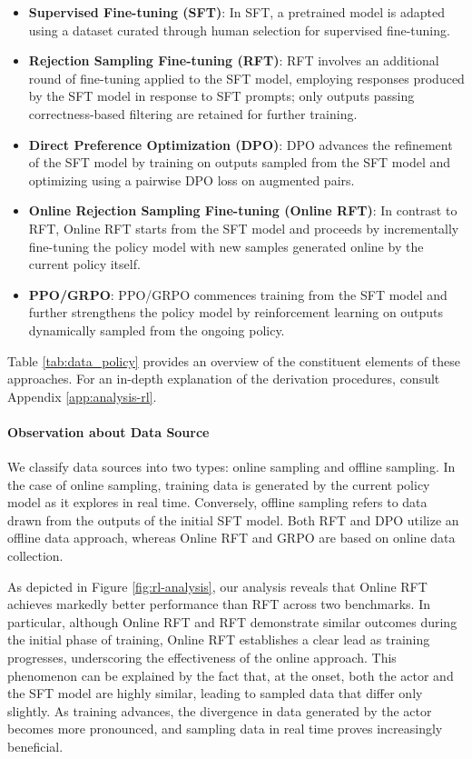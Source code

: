 \begin{itemize}[topsep=0pt]
\begin{itemize}[topsep=0pt]
\begin{itemize}
    \item \textbf{Supervised Fine-tuning (SFT)}: In SFT, a pretrained model is adapted using a dataset curated through human selection for supervised fine-tuning.
    \item \textbf{Rejection Sampling Fine-tuning (RFT)}: RFT involves an additional round of fine-tuning applied to the SFT model, employing responses produced by the SFT model in response to SFT prompts; only outputs passing correctness-based filtering are retained for further training.
    \item \textbf{Direct Preference Optimization (DPO)}: DPO advances the refinement of the SFT model by training on outputs sampled from the SFT model and optimizing using a pairwise DPO loss on augmented pairs.
    \item \textbf{Online Rejection Sampling Fine-tuning (Online RFT)}: In contrast to RFT, Online RFT starts from the SFT model and proceeds by incrementally fine-tuning the policy model with new samples generated online by the current policy itself.
    \item \textbf{PPO/GRPO}: PPO/GRPO commences training from the SFT model and further strengthens the policy model by reinforcement learning on outputs dynamically sampled from the ongoing policy.
\end{itemize}

Table \ref{tab:data_policy} provides an overview of the constituent elements of these approaches. For an in-depth explanation of the derivation procedures, consult Appendix \ref{app:analysis-rl}.

\paragraph{Observation about Data Source} We classify data sources into two types: online sampling and offline sampling. In the case of online sampling, training data is generated by the current policy model as it explores in real time. Conversely, offline sampling refers to data drawn from the outputs of the initial SFT model. Both RFT and DPO utilize an offline data approach, whereas Online RFT and GRPO are based on online data collection.

As depicted in Figure \ref{fig:rl-analysis}, our analysis reveals that Online RFT achieves markedly better performance than RFT across two benchmarks. In particular, although Online RFT and RFT demonstrate similar outcomes during the initial phase of training, Online RFT establishes a clear lead as training progresses, underscoring the effectiveness of the online approach. This phenomenon can be explained by the fact that, at the onset, both the actor and the SFT model are highly similar, leading to sampled data that differ only slightly. As training advances, the divergence in data generated by the actor becomes more pronounced, and sampling data in real time proves increasingly beneficial.


\end{itemize}
\end{itemize}
